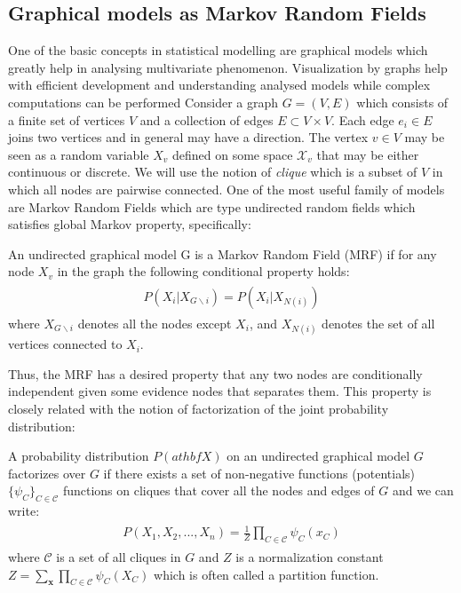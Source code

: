 \documentclass[../report/report.tex]{subfiles}
\begin{document}
\subsection{Graphical models as Markov Random Fields}
One of the basic concepts in statistical modelling are graphical models which greatly help in analysing multivariate phenomenon. Visualization by graphs help with efficient development and understanding analysed models while complex computations can be performed Consider a graph $G = (V,E)$ which consists of a finite set of vertices $V$ and a collection of edges $E \subset V \times V$. Each edge $e_i \in E$ joins two vertices and in general may have a direction. The vertex $v \in V$ may be seen as a random variable $X_v$ defined on some space $\mathcal{X}_v$ that may be either continuous or discrete. We will use the notion of \emph{clique} which is a subset of $V$ in which all nodes are pairwise connected. One of the most useful family of models are Markov Random Fields which are type undirected random fields which satisfies global Markov property, specifically:
\begin{mydef} \cite{koller2009probabilistic} An undirected graphical model G is a Markov Random Field (MRF) if for any node $X_v$ in the graph the following conditional property holds:
\begin{align*}
\begin{split}
P(X_i |X_{G\backslash i} ) = P(X_i | X_{N(i)})
\end{split}
\end{align*}
where $X_{G\backslash i}$ denotes all the nodes except $X_i$, and $X_{N(i)}$ denotes the set of all vertices connected to $X_i$.
\end{mydef}
Thus, the MRF has a desired property that any two nodes are conditionally independent given some evidence nodes that separates them. This property is closely related with the notion of factorization of the joint probability distribution:
\begin{mydef} A probability distribution $P(athbf{X})$ on an undirected graphical model $G$ factorizes over $G$ if there exists a set of non-negative functions (potentials) $\{ \psi_{C} \}_{C \in \mathcal{C}}$ functions on cliques that cover all the nodes and edges of $G$ and we can write:
\begin{align*}
\begin{split}
P(X_1, X_2, ..., X_n) = \frac{1}{Z} \prod_{C \in \mathcal{C}} \psi
_C(x_C)
\end{split}
\end{align*}
where $\mathcal{C}$ is a set of all cliques in $G$ and $Z$ is a normalization constant $Z = \sum_{\mathbf{x}} \prod_{C \in \mathcal{C}} \psi_C(X_C) $ which is often called a partition function.
\end{mydef}
\end{document}
